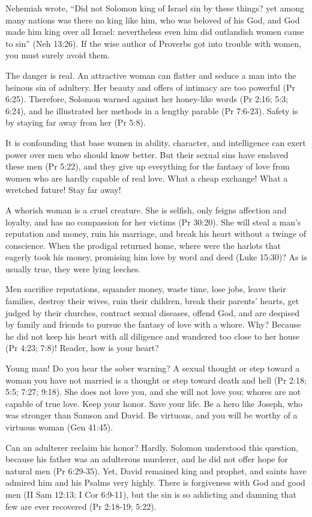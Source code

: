 Nehemiah wrote, “Did not Solomon king of Israel sin by these things? yet among many nations was there no king like him, who was beloved of his God, and God made him king over all Israel: nevertheless even him did outlandish women cause to sin” (Neh 13:26). If the wise author of Proverbs got into trouble with women, you must surely avoid them.

The danger is real. An attractive woman can flatter and seduce a man into the heinous sin of adultery. Her beauty and offers of intimacy are too powerful (Pr 6:25). Therefore, Solomon warned against her honey-like words (Pr 2:16; 5:3; 6:24), and he illustrated her methods in a lengthy parable (Pr 7:6-23). Safety is by staying far away from her (Pr 5:8).

It is confounding that base women in ability, character, and intelligence can exert power over men who should know better. But their sexual sins have enslaved these men (Pr 5:22), and they give up everything for the fantasy of love from women who are hardly capable of real love. What a cheap exchange! What a wretched future! Stay far away!

A whorish woman is a cruel creature. She is selfish, only feigns affection and loyalty, and has no compassion for her victims (Pr 30:20). She will steal a man’s reputation and money, ruin his marriage, and break his heart without a twinge of conscience. When the prodigal returned home, where were the harlots that eagerly took his money, promising him love by word and deed (Luke 15:30)? As is usually true, they were lying leeches.

Men sacrifice reputations, squander money, waste time, lose jobs, leave their families, destroy their wives, ruin their children, break their parents’ hearts, get judged by their churches, contract sexual diseases, offend God, and are despised by family and friends to pursue the fantasy of love with a whore. Why? Because he did not keep his heart with all diligence and wandered too close to her house (Pr 4:23; 7:8)! Reader, how is your heart?

Young man! Do you hear the sober warning? A sexual thought or step toward a woman you have not married is a thought or step toward death and hell (Pr 2:18; 5:5; 7:27; 9:18). She does not love you, and she will not love you; whores are not capable of true love. Keep your honor. Save your life. Be a hero like Joseph, who was stronger than Samson and David. Be virtuous, and you will be worthy of a virtuous woman (Gen 41:45).

Can an adulterer reclaim his honor? Hardly. Solomon understood this question, because his father was an adulterous murderer, and he did not offer hope for natural men (Pr 6:29-35). Yet, David remained king and prophet, and saints have admired him and his Psalms very highly. There is forgiveness with God and good men (II Sam 12:13; I Cor 6:9-11), but the sin is so addicting and damning that few are ever recovered (Pr 2:18-19; 5:22).

